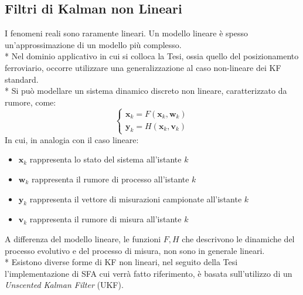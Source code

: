 \subsection{Filtri di Kalman non Lineari}
I fenomeni reali sono raramente lineari. Un modello lineare \`e spesso un'approssimazione di un modello pi\`u complesso. \cite{gigi}\\*
Nel dominio applicativo in cui si colloca la Tesi, ossia quello del posizionamento ferroviario, occorre utilizzare una generalizzazione al caso non-lineare dei KF standard.\\*
Si pu\`o modellare un sistema dinamico discreto non lineare, caratterizzato da rumore, come:
$$
\begin{cases}
\mathbf{x}_k = F(\mathbf{x}_k,\mathbf{w}_k) \\
\mathbf{y}_k = H(\mathbf{x}_k,\mathbf{v}_k)
\end{cases}
$$
In cui, in analogia con il caso lineare:
\begin{itemize}
	\item $\mathbf x_k$ rappresenta lo stato del sistema all'istante $k$
	\item $\mathbf w_k$ rappresenta il rumore di processo all'istante $k$
	\item $\mathbf y_k$ rappresenta il vettore di misurazioni campionate all'istante $k$
	\item $\mathbf v_k$ rappresenta il rumore di misura all'istante $k$
\end{itemize}
A differenza del modello lineare, le funzioni $F,H$ che descrivono le dinamiche del processo evolutivo e del processo di misura, non sono in generale lineari. \cite{ukffne}\\*
Esistono diverse forme di KF non lineari, nel seguito della Tesi l'implementazione di SFA cui verr\`a fatto riferimento, \`e basata sull'utilizzo di un \emph{Unscented Kalman Filter} (UKF).